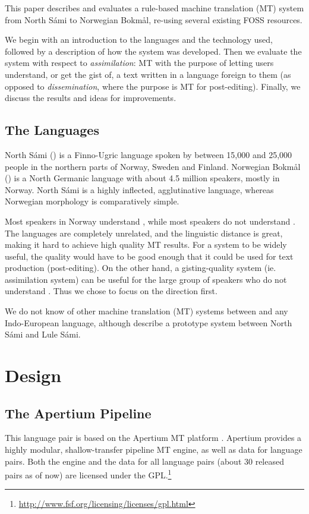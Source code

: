 \documentclass{book}
\begin{document}
This paper describes and evaluates a rule-based machine translation
(MT) system from North S\'{a}mi to Norwegian Bokm{\aa}l, re-using
several existing FOSS resources. 

We begin with an introduction to the languages and the technology
used, followed by a description of how the system was developed. Then
we evaluate the system with respect to \textit{assimilation}: MT with
the purpose of letting users understand, or get the gist of, a text
written in a language foreign to them (as opposed to
\textit{dissemination}, where the purpose is MT for post-editing).
Finally, we discuss the results and ideas for improvements.


\subsection{The Languages}
North S\'{a}mi (\sme{}) is a Finno-Ugric language spoken by between 
15,000 and 25,000 people in the northern parts of Norway, Sweden and
Finland. Norwegian Bokm{\aa}l (\nob{}) is a North Germanic language
with about 4.5 million speakers, mostly in Norway. North S\'{a}mi %
is a highly inflected, agglutinative language, whereas Norwegian
morphology is comparatively simple.

Most \sme{} speakers in Norway understand \nob{}, while most \nob{}
speakers do not understand \sme{}. The languages are completely
unrelated, and the linguistic distance is great, making it hard to
achieve high quality MT results. For a \nobsme{} system to be widely
useful, the quality would have to be good enough that it could be used
for text production (post-editing). On the other hand, a \smenob{}
gisting-quality system (ie. assimilation system) can be useful for the
large group of \nob{} speakers who do not understand \sme{}. Thus we
chose to focus on the \smenob{} direction first.

We do not know of other machine translation (MT) systems between \sme{}
and any Indo-European language, although \citet{tyers2009dpm} describe %
a prototype system between North S\'{a}mi and Lule S\'{a}mi.



\section{Design}
 \label{sec:design}

\subsection{The Apertium Pipeline}
This language pair is based on the Apertium MT
platform \citep{forcada2011afp,zubizarreta2009amt}. Apertium provides a
highly modular, shallow-transfer pipeline MT engine, as well as data
for language pairs. Both the engine and the data for all language
pairs (about 30 released pairs as of now) are licensed under the
GPL.\footnote{\href{http://www.fsf.org/licensing/licenses/gpl.html}{http://www.fsf.org/licensing/licenses/gpl.html}}
\end{document}
